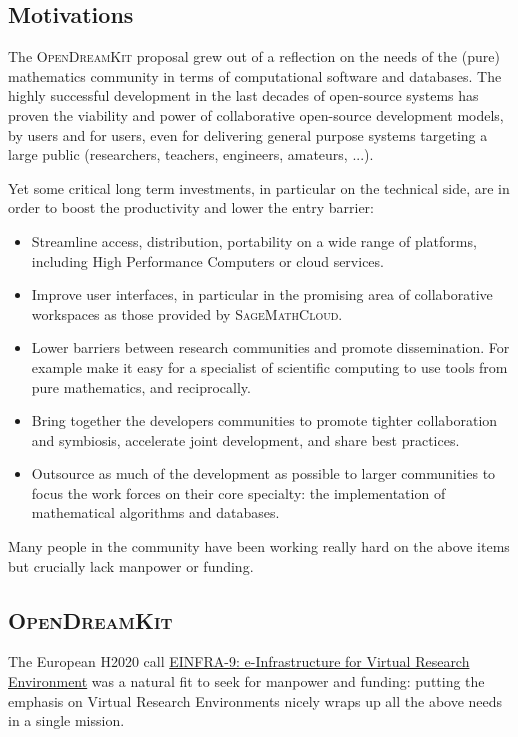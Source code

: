 \documentclass{llncs}
\newcommand{\software}[1]{\textsc{#1}\xspace}
\newcommand{\SMC}{\software{SageMathCloud}}
\newcommand{\ODK}{\software{OpenDreamKit}}
\begin{document}
\subsection{Motivations}

The \ODK proposal grew out of a reflection on the needs of the (pure)
mathematics community in terms of computational software and
databases. The highly successful development in the last decades of
open-source systems has proven the viability and power of
collaborative open-source development models, by users and for users,
even for delivering general purpose systems targeting a large public
(researchers, teachers, engineers, amateurs, ...).

Yet some critical long term investments, in particular on the
technical side, are in order to boost the productivity and lower the
entry barrier:

\begin{itemize}
\item Streamline access, distribution, portability on a wide range of
  platforms, including High Performance Computers or cloud services.
\item Improve user interfaces, in particular in the promising area of
  collaborative workspaces as those provided by \SMC.
\item Lower barriers between research communities and promote
  dissemination. For example make it easy for a specialist of
  scientific computing to use tools from pure mathematics, and
  reciprocally.
\item Bring together the developers communities to promote tighter
  collaboration and symbiosis, accelerate joint development, and share
  best practices.
\item Outsource as much of the development as possible to larger
  communities to focus the work forces on their core specialty: the
  implementation of mathematical algorithms and databases.
\end{itemize}

Many people in the community have been working really hard on the
above items but crucially lack manpower or funding.

\subsection{\ODK}

The European H2020 call
\href{http://ec.europa.eu/research/participants/portal/desktop/en/opportunities/h2020/topics/2144-einfra-9-2015.html}{EINFRA-9:
  e-Infrastructure for Virtual Research Environment} was a natural fit
to seek for manpower and funding: putting the emphasis on Virtual
Research Environments nicely wraps up all the above needs in a single
mission.
\end{document}

